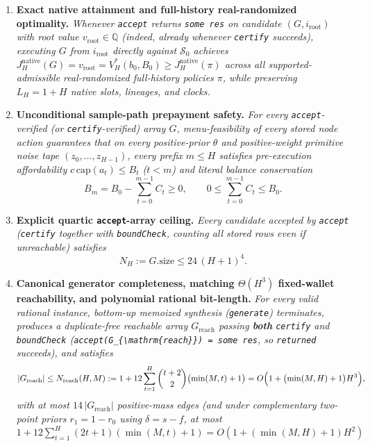 \documentclass[11pt,a4paper]{article}
\providecommand{\tightlist}{\setlength{\itemsep}{2pt}\setlength{\parskip}{0pt}}
\begin{document}
\begin{enumerate}
\def\labelenumi{\arabic{enumi}.}
\tightlist
\item
  \textbf{Exact native attainment and full-history real-randomized
  optimality.} \emph{Whenever \texttt{accept} returns \texttt{some\ res}
  on candidate \((G, i_{\mathrm{root}})\) with root value
  \(v_{\mathrm{root}} \in \mathbb{Q}\) (indeed, already whenever
  \texttt{certify} succeeds), executing \(G\) from \(i_{\mathrm{root}}\)
  directly against \(\mathcal{S}_0\) achieves
  \(J_H^{\mathrm{native}}(G) = v_{\mathrm{root}} = V_H^*(b_0, B_0) \ge J_H^{\mathrm{native}}(\pi)\)
  across all supported-admissible real-randomized full-history policies
  \(\pi\), while preserving \(L_H = 1 + H\) native slots, lineages, and
  clocks.}
\item
  \textbf{Unconditional sample-path prepayment safety.} \emph{For every
  \texttt{accept}-verified (or \texttt{certify}-verified) array \(G\),
  menu-feasibility of every stored node action guarantees that on every
  positive-prior \(\theta\) and positive-weight primitive noise tape
  \((z_0, \dots, z_{H-1})\), every prefix \(m \le H\) satisfies
  pre-execution affordability \(c\,\mathrm{cap}(a_t) \le B_t\)
  (\(t < m\)) and literal balance conservation}
  \[B_m = B_0 - \sum_{t=0}^{m-1} C_t \ge 0, \qquad 0 \le \sum_{t=0}^{m-1} C_t \le B_0.\]
\item
  \textbf{Explicit quartic \texttt{accept}-array ceiling.} \emph{Every
  candidate accepted by \texttt{accept} (\texttt{certify} together with
  \texttt{boundCheck}, counting all stored rows even if unreachable)
  satisfies} \[N_H := G.\mathrm{size} \le 24\,(H + 1)^4.\]
\item
  \textbf{Canonical generator completeness, matching \(\Theta(H^3)\)
  fixed-wallet reachability, and polynomial rational bit-length.}
  \emph{For every valid rational instance, bottom-up memoized synthesis
  (\texttt{generate}) terminates, produces a duplicate-free reachable
  array \(G_{\mathrm{reach}}\) passing \textbf{both} \texttt{certify}
  and \texttt{boundCheck}
  (\texttt{accept(G\_\{\textbackslash{}mathrm\{reach\}\})\ =\ some\ res},
  so \texttt{returned} succeeds), and satisfies}
  \[|G_{\mathrm{reach}}| \le N_{\mathrm{reach}}(H, M) := 1 + 12 \sum_{t=1}^{H} \binom{t+2}{2}\bigl(\min(M, t) + 1\bigr) = O\Bigl(1 + \bigl(\min(M, H) + 1\bigr)H^3\Bigr),\]
  \emph{with at most \(14\,|G_{\mathrm{reach}}|\) positive-mass edges
  (and under complementary two-point priors \(r_1 = 1 - r_0\) using
  \(\delta = s - f\), at most
  \(1 + 12\sum_{t=1}^H (2t + 1)(\min(M, t) + 1) = O(1 + (\min(M, H) + 1)H^2)\)
}
\end{enumerate}
\end{document}
